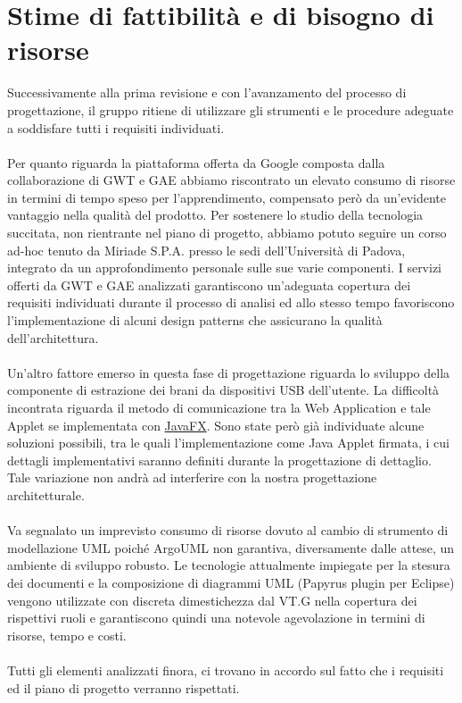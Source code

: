 \chapter{Stime di fattibilit\`a e di bisogno di risorse}
Successivamente alla prima revisione e con l'avanzamento del processo di
progettazione, il gruppo ritiene di utilizzare gli strumenti e le procedure
adeguate a soddisfare tutti i requisiti individuati.
\\\\
Per quanto riguarda la piattaforma offerta da Google composta dalla
collaborazione di GWT e GAE abbiamo riscontrato un elevato consumo di risorse in
termini di tempo speso per l'apprendimento, compensato per\`o da un'evidente
vantaggio nella qualit\`a del prodotto. Per sostenere lo studio della tecnologia
succitata, non rientrante nel piano di progetto, abbiamo potuto seguire un corso
ad-hoc tenuto da Miriade S.P.A. presso le sedi dell'Universit\`a di Padova,
integrato da un approfondimento personale sulle sue varie componenti. I servizi
offerti da GWT e GAE analizzati garantiscono un'adeguata copertura dei
requisiti individuati durante il processo di analisi ed allo stesso tempo favoriscono
l'implementazione di alcuni design patterns che assicurano la qualit\`a
dell'architettura.
\\\\
Un'altro fattore emerso in questa fase di progettazione riguarda lo sviluppo
della componente di estrazione dei brani da dispositivi USB dell'utente. La
difficolt\`a incontrata riguarda il metodo di comunicazione tra la Web
Application e tale Applet se implementata con \underline{JavaFX}. Sono state
per\`o gi\`a individuate alcune soluzioni possibili, tra le quali
l'implementazione come Java Applet firmata, i cui dettagli implementativi saranno definiti durante la
progettazione di dettaglio. Tale variazione non andr\`a ad interferire con la
nostra progettazione architetturale.
\\\\
Va segnalato un imprevisto consumo di risorse dovuto al cambio di strumento di
modellazione UML poich\'e ArgoUML non garantiva, diversamente dalle attese, un
ambiente di sviluppo robusto. Le tecnologie attualmente impiegate per la stesura
dei documenti e la composizione di diagrammi UML (Papyrus plugin per Eclipse)
vengono utilizzate con discreta dimestichezza dal VT.G nella copertura dei
rispettivi ruoli e garantiscono quindi una notevole agevolazione in termini di
risorse, tempo e costi.
\\\\
Tutti gli elementi analizzati finora, ci trovano in accordo sul fatto che i
requisiti ed il piano di progetto verranno rispettati.

\listoftables
{}
\listoffigures
{}

